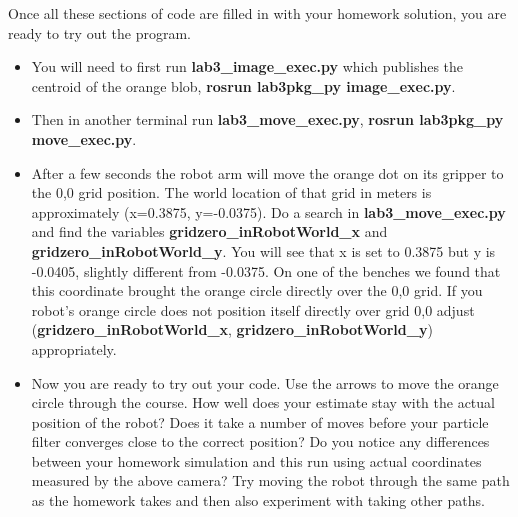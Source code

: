 Once all these sections of code are filled in with your homework solution, you are ready to try out the program.  
\begin{itemize}
\item You will need to first run \textbf{lab3\_image\_exec.py} which publishes the centroid of the orange blob, \textbf{rosrun lab3pkg\_py image\_exec.py}.  
\item Then in another terminal run \textbf{lab3\_move\_exec.py}, \textbf{rosrun lab3pkg\_py move\_exec.py}.
\item After a few seconds the robot arm will move the orange dot on its gripper to the 0,0 grid position.  The world location of that grid in meters is approximately (x=0.3875, y=-0.0375).  Do a search in \textbf{lab3\_move\_exec.py} and find the variables \textbf{gridzero\_inRobotWorld\_x} and \textbf{gridzero\_inRobotWorld\_y}. You will see that x is set to 0.3875 but y is -0.0405, slightly different from -0.0375.  On one of the benches we found that this coordinate brought the orange circle directly over the 0,0 grid.  If you robot’s orange circle does not position itself directly over grid 0,0 adjust (\textbf{gridzero\_inRobotWorld\_x}, \textbf{gridzero\_inRobotWorld\_y}) appropriately.  
\item Now you are ready to try out your code.  Use the arrows to move the orange circle through the course.  How well does your estimate stay with the actual position of the robot?  Does it take a number of moves before your particle filter converges close to the correct position?  Do you notice any differences between your homework simulation and this run using actual coordinates measured by the above camera?  Try moving the robot through the same path as the homework takes and then also experiment with taking other paths.  
\end{itemize}

